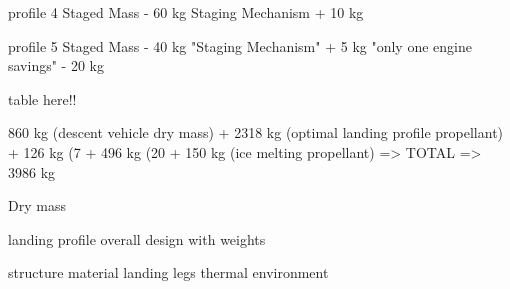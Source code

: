 profile 4
Staged Mass  - 60 kg
Staging Mechanism + 10 kg

profile 5
Staged Mass  - 40 kg
"Staging Mechanism" + 5 kg 
"only one engine savings" - 20 kg



table here!!




860 kg (descent vehicle dry mass)
+ 2318 kg (optimal landing profile propellant)
+ 126 kg (7%
+ 496 kg (20%
+ 150 kg (ice melting propellant)
 => TOTAL => 3986 kg

Dry mass

landing profile
overall design with weights 
	
	structure
	material
	landing legs
thermal environment

